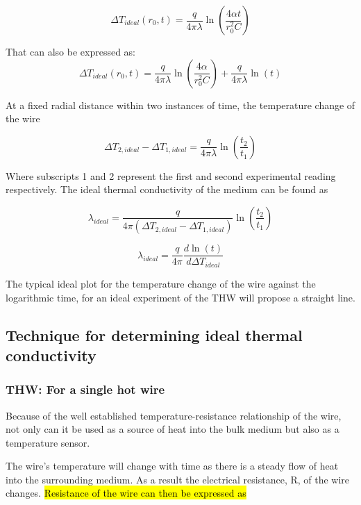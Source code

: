 \documentclass{article}
\begin{document}
\begin{equation} \label{eq:ideal}
\Delta T_{ideal}(r_0,t) =  \frac{q}{4 \pi \lambda} \ln \left( \frac{4 \alpha t}{r^2_0 C}\right)
\end{equation}

That can also be expressed as:
	\begin{equation} \label{eq:ideal2}
	\Delta T_{ideal}(r_0,t) =  \frac{q}{4 \pi \lambda} \ln \left( \frac{4 \alpha }		{r^2_0 C}\right) + \frac{q}{4 \pi \lambda} \ln \left( t \right)
	\end{equation}

At a fixed radial distance within two instances of time, the temperature change of the wire

$$\Delta T_{2,ideal} - \Delta T_{1,ideal} = \frac{q}{4 \pi \lambda} \ln \left( \frac{t_2}{t_1} \right)$$

Where subscripts 1 and 2 represent the first and second experimental reading respectively. The ideal thermal conductivity of the medium can be found as

$$\lambda_{ideal} =  \frac{q}{4 \pi \left( \Delta T_{2,ideal} - \Delta T_{1,ideal} \right)}\ln \left( \frac{t_2}{t_1} \right)$$

\newpage

	\begin{equation} \label{eq:idealconductivity}
\lambda_{ideal} =  \frac{q}{4 \pi} \frac{d\ln \left( t \right)}{d\Delta T_{ideal}}
	\end{equation}
	
The typical ideal plot for the temperature change of the wire against the logarithmic time, for an ideal experiment of the THW will propose a straight line.

\subsection{Technique for determining ideal thermal conductivity}
\subsubsection{THW: For a single hot wire}
Because of the well established temperature-resistance relationship of the wire, not only can it be used as a source of heat into the bulk medium but also as a temperature sensor.

The wire’s temperature will change with time as there is a steady flow of heat into the  surrounding medium. As a result the electrical resistance, R, of the wire changes.
\hl{Resistance of the wire can then be expressed as}
\end{document}
